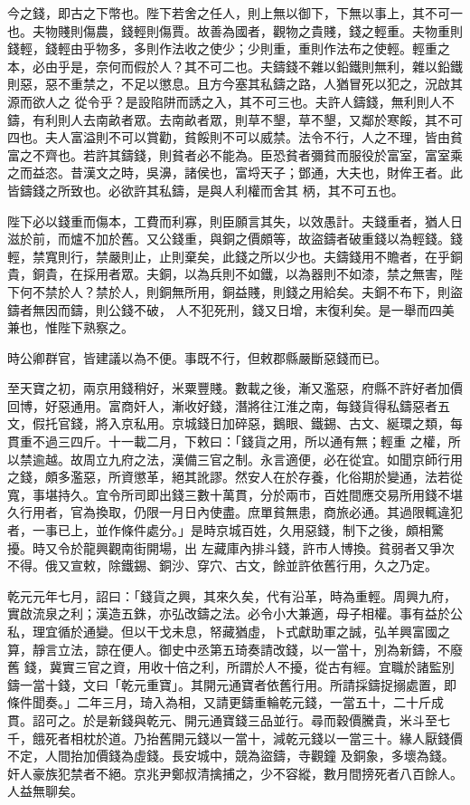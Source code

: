 \begin{pinyinscope}
 今之錢，即古之下幣也。陛下若舍之任人，則上無以御下，下無以事上，其不可一也。夫物賤則傷農，錢輕則傷賈。故善為國者，觀物之貴賤，錢之輕重。夫物重則錢輕，錢輕由乎物多，多則作法收之使少；少則重，重則作法布之使輕。輕重之本，必由乎是，奈何而假於人？其不可二也。夫鑄錢不雜以鉛鐵則無利，雜以鉛鐵則惡，惡不重禁之，不足以懲息。且方今塞其私鑄之路，人猶冒死以犯之，況啟其源而欲人之
 從令乎？是設陷阱而誘之入，其不可三也。夫許人鑄錢，無利則人不鑄，有利則人去南畝者眾。去南畝者眾，則草不墾，草不墾，又鄰於寒餒，其不可四也。夫人富溢則不可以賞勸，貧餒則不可以威禁。法令不行，人之不理，皆由貧富之不齊也。若許其鑄錢，則貧者必不能為。臣恐貧者彌貧而服役於富室，富室乘之而益恣。昔漢文之時，吳濞，諸侯也，富埒天子；鄧通，大夫也，財侔王者。此皆鑄錢之所致也。必欲許其私鑄，是與人利權而舍其
 柄，其不可五也。



 陛下必以錢重而傷本，工費而利寡，則臣願言其失，以效愚計。夫錢重者，猶人日滋於前，而爐不加於舊。又公錢重，與銅之價頗等，故盜鑄者破重錢以為輕錢。錢輕，禁寬則行，禁嚴則止，止則棄矣，此錢之所以少也。夫鑄錢用不贍者，在乎銅貴，銅貴，在採用者眾。夫銅，以為兵則不如鐵，以為器則不如漆，禁之無害，陛下何不禁於人？禁於人，則銅無所用，銅益賤，則錢之用給矣。夫銅不布下，則盜鑄者無因而鑄，則公錢不破，
 人不犯死刑，錢又日增，末復利矣。是一舉而四美兼也，惟陛下熟察之。



 時公卿群官，皆建議以為不便。事既不行，但敕郡縣嚴斷惡錢而已。



 至天寶之初，兩京用錢稍好，米粟豐賤。數載之後，漸又濫惡，府縣不許好者加價回博，好惡通用。富商奸人，漸收好錢，潛將往江淮之南，每錢貨得私鑄惡者五文，假托官錢，將入京私用。京城錢日加碎惡，鵝眼、鐵錫、古文、綖環之類，每貫重不過三四斤。十一載二月，下敕曰：「錢貨之用，所以通有無；輕重
 之權，所以禁逾越。故周立九府之法，漢備三官之制。永言適便，必在從宜。如聞京師行用之錢，頗多濫惡，所資懲革，絕其訛謬。然安人在於存養，化俗期於變通，法若從寬，事堪持久。宜令所司即出錢三數十萬貫，分於兩市，百姓間應交易所用錢不堪久行用者，官為換取，仍限一月日內使盡。庶單貧無患，商旅必通。其過限輒違犯者，一事已上，並作條件處分。」是時京城百姓，久用惡錢，制下之後，頗相驚擾。時又令於龍興觀南街開場，出
 左藏庫內排斗錢，許市人博換。貧弱者又爭次不得。俄又宣敕，除鐵錫、銅沙、穿穴、古文，餘並許依舊行用，久之乃定。



 乾元元年七月，詔曰：「錢貨之興，其來久矣，代有沿革，時為重輕。周興九府，實啟流泉之利；漢造五銖，亦弘改鑄之法。必令小大兼適，母子相權。事有益於公私，理宜循於通變。但以干戈未息，帑藏猶虛，卜式獻助軍之誠，弘羊興富國之算，靜言立法，諒在便人。御史中丞第五琦奏請改錢，以一當十，別為新鑄，不廢舊
 錢，冀實三官之資，用收十倍之利，所謂於人不擾，從古有經。宜職於諸監別鑄一當十錢，文曰「乾元重寶」。其開元通寶者依舊行用。所請採鑄捉搦處置，即條件聞奏。」二年三月，琦入為相，又請更鑄重輪乾元錢，一當五十，二十斤成貫。詔可之。於是新錢與乾元、開元通寶錢三品並行。尋而穀價騰貴，米斗至七千，餓死者相枕於道。乃抬舊開元錢以一當十，減乾元錢以一當三十。緣人厭錢價不定，人間抬加價錢為虛錢。長安城中，競為盜鑄，寺觀鐘
 及銅象，多壞為錢。奸人豪族犯禁者不絕。京兆尹鄭叔清擒捕之，少不容縱，數月間搒死者八百餘人。人益無聊矣。




\end{pinyinscope}
